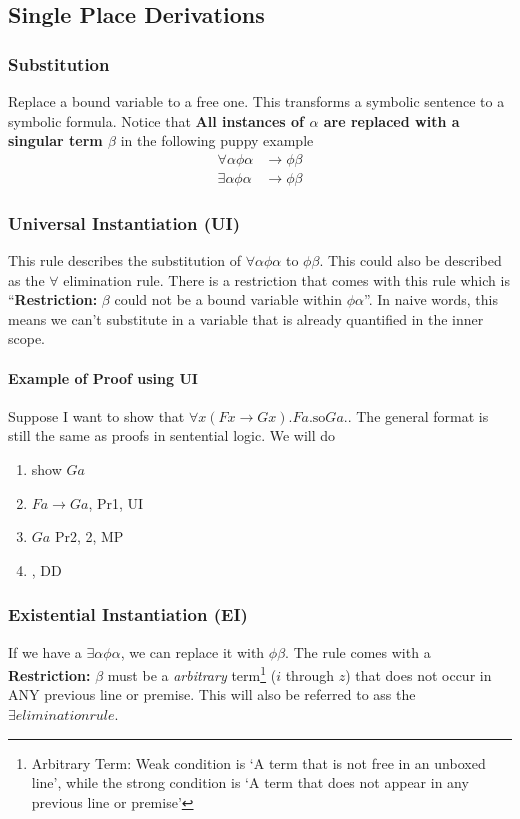 \documentclass[10pt]{article}
\renewcommand{\implies}{\rightarrow}
\begin{document}
\subsection{Single Place Derivations}
\subsubsection{Substitution}
Replace a bound variable to a free one. This transforms a symbolic sentence to a symbolic formula. Notice that \textbf{All instances of $\alpha$ are replaced with a singular term $\beta$} in the following puppy example
\begin{align*}
    \forall \alpha \phi \alpha &\implies \phi \beta \\
    \exists \alpha \phi \alpha &\implies \phi \beta
\end{align*}

\subsubsection{Universal Instantiation (UI)} This rule describes the substitution of $\forall \alpha \phi \alpha$ to $ \phi \beta$. This could also be described as the $\forall$ elimination rule. There is a restriction that comes with this rule which is ``\textbf{Restriction:} $\beta$ could not be a bound variable within $\phi \alpha$''. In naive words, this means we can't substitute in a variable that is already quantified in the inner scope. 

\paragraph{Example of Proof using UI}
Suppose I want to show that $\forall x (Fx\implies Gx). Fa. \text{so} Ga.$. The general format is still the same as proofs in sentential logic. We will do
\begin{enumerate}
    \item show $Ga$
    \item \quad $Fa\implies Ga$, Pr1, UI
    \item \quad $Ga$ Pr2, 2, MP
    \item {}, DD
\end{enumerate}

\subsubsection{Existential Instantiation (EI)} If we have a $\exists \alpha \phi \alpha$, we can replace it with $\phi \beta$. The rule comes with a \textbf{Restriction:} $\beta$ must be a \textit{arbitrary} term\footnote{Arbitrary Term: Weak condition is `A term that is not free in an unboxed line', while the strong condition is `A term that does not appear in any previous line or premise'} ($i$ through $z$) that does not occur in ANY previous line or premise. This will also be referred to ass the $\exists elimination rule$.  
\end{document}
